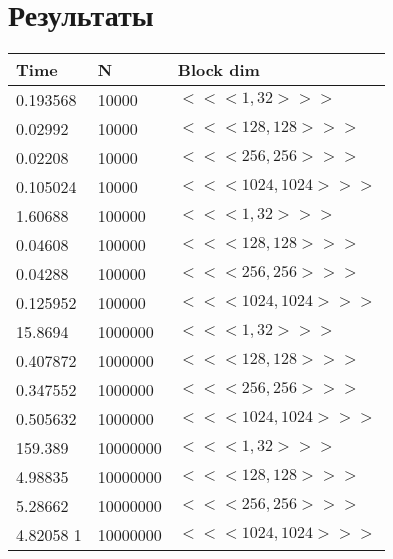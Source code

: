 \section*{Результаты}

\begin{center}
\begin{tabular}{| l | l | l |}
    \hline
    Time & N &  Block dim \\
    \hline
    0.193568    & 10000     & $<<<1, 32>>>$ \\
    0.02992     & 10000     & $<<<128, 128>>>$ \\
    0.02208     & 10000     & $<<<256, 256>>>$ \\
    0.105024    & 10000     & $<<<1024, 1024>>>$ \\
    1.60688     & 100000    & $<<<1, 32>>>$ \\
    0.04608     & 100000    & $<<<128, 128>>>$ \\
    0.04288     & 100000    & $<<<256, 256>>>$ \\
    0.125952    & 100000    & $<<<1024, 1024>>>$ \\
    15.8694     & 1000000   & $<<<1, 32>>>$ \\
    0.407872    & 1000000   & $<<<128, 128>>>$ \\
    0.347552    & 1000000   & $<<<256, 256>>>$ \\
    0.505632    & 1000000   & $<<<1024, 1024>>>$ \\
    159.389     & 10000000  & $<<<1, 32>>>$ \\
    4.98835     & 10000000  & $<<<128, 128>>>$ \\
    5.28662     & 10000000  & $<<<256, 256>>>$ \\
    4.82058 1   & 10000000  & $<<<1024, 1024>>>$ \\
    \hline
\end{tabular}
\end{center}


\pagebreak